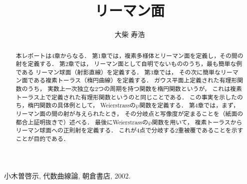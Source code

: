\documentclass[11pt, a4paper, dvipdfmx]{jsarticle}
\theoremstyle{definition}
\theoremstyle{mystyle}
\numberwithin{equation}{section} %
\begin{document}
\title{リーマン面}
\author{大柴 寿浩}
\date{}

\begin{titlepage}
\maketitle
\begin{abstract}
    本レポートは4章からなる．
    第1章では，複素多様体とリーマン面を定義し，その間の射を定義する．
    第2章では，
    リーマン面として自明でないもののうち，最も簡単な例である
    リーマン球面（射影直線）を定義する．
    第3章では，
    その次に簡単なリーマン面である複素トーラス（楕円曲線）を定義する．
    ガウス平面上定義された有理形関数のうち，
    実数上一次独立な2つの周期を持つ関数を楕円関数というが，
    これは複素トーラス上で定義された有理形関数というのと同じことである．
    この事実を示したのち，楕円関数の具体例として，
    Weierstrassの$\wp$関数を定義する．
    第4章では，まず，リーマン面の間の射が与えられたとき，
    その分岐点と写像度が定まることを（紙面の都合上証明抜きで）述べる．
    最後にWeierstrassの$\wp$関数を用いて，
    複素トーラスからリーマン球面への正則射を定義する．
    これが4点で分岐する2重被覆であることを示すことが目的である．
\end{abstract}
\thispagestyle{empty}
\end{titlepage}





\begin{thebibliography}{15}

 小木曽啓示, 代数曲線論, 朝倉書店, 2002. 

\end{thebibliography}
\end{document}
